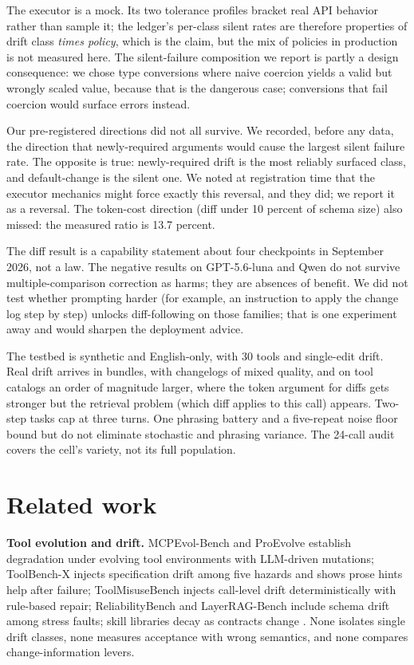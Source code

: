 The executor is a mock. Its two tolerance profiles bracket real API behavior rather than sample it; the ledger's per-class silent rates are therefore properties of drift class \emph{times policy}, which is the claim, but the mix of policies in production is not measured here. The silent-failure composition we report is partly a design consequence: we chose type conversions where naive coercion yields a valid but wrongly scaled value, because that is the dangerous case; conversions that fail coercion would surface errors instead.

Our pre-registered directions did not all survive. We recorded, before any data, the direction that newly-required arguments would cause the largest silent failure rate. The opposite is true: newly-required drift is the most reliably surfaced class, and default-change is the silent one. We noted at registration time that the executor mechanics might force exactly this reversal, and they did; we report it as a reversal. The token-cost direction (diff under 10 percent of schema size) also missed: the measured ratio is 13.7 percent.

The diff result is a capability statement about four checkpoints in September 2026, not a law. The negative results on GPT-5.6-luna and Qwen do not survive multiple-comparison correction as harms; they are absences of benefit. We did not test whether prompting harder (for example, an instruction to apply the change log step by step) unlocks diff-following on those families; that is one experiment away and would sharpen the deployment advice.

The testbed is synthetic and English-only, with 30 tools and single-edit drift. Real drift arrives in bundles, with changelogs of mixed quality, and on tool catalogs an order of magnitude larger, where the token argument for diffs gets stronger but the retrieval problem (which diff applies to this call) appears. Two-step tasks cap at three turns. One phrasing battery and a five-repeat noise floor bound but do not eliminate stochastic and phrasing variance. The 24-call audit covers the cell's variety, not its full population.

\section{Related work}
\label{sec:related}

\textbf{Tool evolution and drift.} MCPEvol-Bench \citep{mcpevol} and ProEvolve \citep{proevolve} establish degradation under evolving tool environments with LLM-driven mutations; ToolBench-X \citep{toolbenchx} injects specification drift among five hazards and shows prose hints help after failure; ToolMisuseBench \citep{toolmisuse} injects call-level drift deterministically with rule-based repair; ReliabilityBench \citep{reliabilitybench} and LayerRAG-Bench \citep{layerrag} include schema drift among stress faults; skill libraries decay as contracts change \citep{skilldrift}. None isolates single drift classes, none measures acceptance with wrong semantics, and none compares change-information levers.


